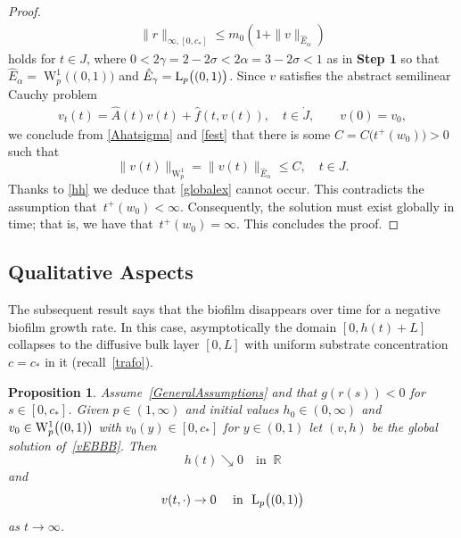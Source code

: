 \documentclass[reqno,11pt]{amsart}
\newtheorem{prop}[thm]{Proposition}
\numberwithin{equation}{section}
\newcommand{\R}{\mathbb{R}}
\begin{document}
\begin{proof}
\begin{align}
\|r\|_{\infty,[0,c_*]}\le m_0(1+\|v\|_{\hat{E}_\alpha})
\end{align} 
holds for $t\in J$, where $0<2\gamma=2-2\sigma<2\alpha=3-2\sigma<1$ as
 in {\bf Step 1} so that
$\hat{E}_\alpha=\operatorname{W}_p^1\bigl( (0,1) \bigr)$ and
$\hat{E}_\gamma={\rm L} _p\bigl( (0,1) \bigr)$. Since
$v$ satisfies the abstract semilinear Cauchy problem 
\begin{align*}
  v_t(t)=\hat{A}(t)v(t) + \hat{f}(t,v(t)),\quad  t\in \dot J,\qquad v(0)=v_0,
\end{align*}
we conclude from \eqref{Ahatsigma} and \eqref{fest} that there is some
$C=C\bigl(t^+(w_0)\bigr)>0$ such that 
$$
\|v(t)\|_{\operatorname{W}_p^1}=\|v(t)\|_{\hat{E}_\alpha}\le C,
\quad t\in J.
$$
Thanks to \eqref{hh} we deduce that \eqref{globalex} cannot occur. This
contradicts the assumption that~$t^+(w_0)<\infty$. Consequently, the
solution must exist globally in time; that is, we have
that~$t^+(w_0)=\infty$. This concludes the proof.
\end{proof}



\subsection{Qualitative Aspects}

The subsequent result says that the biofilm disappears over time for a
negative biofilm growth rate. In this case, asymptotically the domain
\mbox{$[0,h(t)+L]$} collapses to the diffusive bulk layer $[0,L]$ with
uniform substrate concentration~$c=c_*$ in it (recall~\eqref{trafo}).

\begin{prop}\label{P5}
Assume~\eqref{GeneralAssumptions} and that $g(r(s))< 0$ for $s\in
[0,c_*]$. Given $p\in (1,\infty)$ and initial values $h_0\in
(0,\infty)$ and $v_0\in {\rm W}_p^1\bigl(
(0,1)\bigr)$ with $v_0(y)\in [0,c_*]$ for $y\in (0,1)$ let  $(v,h)$
be the global solution of~\eqref{vEBBB}. Then 
$$
h(t)\searrow 0\quad \text{in }\ \R
$$
and
$$
v(t,\cdot)\rightarrow 0\quad \text{ in }\ {\rm L}_p\big((0,1)\big)
$$
as $t\rightarrow \infty$.
\end{prop}
\end{document}
